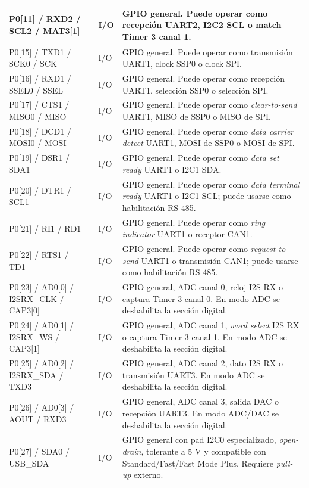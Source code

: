 ﻿\documentclass[11pt]{article}
\begin{document}
\begin{longtable}{|>{\raggedright\arraybackslash}p{}|>{\raggedright\arraybackslash}p{}|>{\raggedright\arraybackslash}p{}|>{\raggedright\arraybackslash}p{}|}
\hline
P0[11] / RXD2 / SCL2 / MAT3[1] & 49 & I/O & GPIO general. Puede operar como recepción UART2, I2C2 SCL o match Timer 3 canal 1. \\
\hline
P0[15] / TXD1 / SCK0 / SCK & 62 & I/O & GPIO general. Puede operar como transmisión UART1, clock SSP0 o clock SPI. \\
\hline
P0[16] / RXD1 / SSEL0 / SSEL & 63 & I/O & GPIO general. Puede operar como recepción UART1, selección SSP0 o selección SPI. \\
\hline
P0[17] / CTS1 / MISO0 / MISO & 61 & I/O & GPIO general. Puede operar como \textit{clear-to-send} UART1, MISO de SSP0 o MISO de SPI. \\
\hline
P0[18] / DCD1 / MOSI0 / MOSI & 60 & I/O & GPIO general. Puede operar como \textit{data carrier detect} UART1, MOSI de SSP0 o MOSI de SPI. \\
\hline
P0[19] / DSR1 / SDA1 & 59 & I/O & GPIO general. Puede operar como \textit{data set ready} UART1 o I2C1 SDA. \\
\hline
P0[20] / DTR1 / SCL1 & 58 & I/O & GPIO general. Puede operar como \textit{data terminal ready} UART1 o I2C1 SCL; puede usarse como habilitación RS-485. \\
\hline
P0[21] / RI1 / RD1 & 57 & I/O & GPIO general. Puede operar como \textit{ring indicator} UART1 o receptor CAN1. \\
\hline
P0[22] / RTS1 / TD1 & 56 & I/O & GPIO general. Puede operar como \textit{request to send} UART1 o transmisión CAN1; puede usarse como habilitación RS-485. \\
\hline
P0[23] / AD0[0] / I2SRX\_CLK / CAP3[0] & 9 & I/O & GPIO general, ADC canal 0, reloj I2S RX o captura Timer 3 canal 0. En modo ADC se deshabilita la sección digital. \\
\hline
P0[24] / AD0[1] / I2SRX\_WS / CAP3[1] & 8 & I/O & GPIO general, ADC canal 1, \textit{word select} I2S RX o captura Timer 3 canal 1. En modo ADC se deshabilita la sección digital. \\
\hline
P0[25] / AD0[2] / I2SRX\_SDA / TXD3 & 7 & I/O & GPIO general, ADC canal 2, dato I2S RX o transmisión UART3. En modo ADC se deshabilita la sección digital. \\
\hline
P0[26] / AD0[3] / AOUT / RXD3 & 6 & I/O & GPIO general, ADC canal 3, salida DAC o recepción UART3. En modo ADC/DAC se deshabilita la sección digital. \\
\hline
P0[27] / SDA0 / USB\_SDA & 25 & I/O & GPIO general con pad I2C0 especializado, \textit{open-drain}, tolerante a 5 V y compatible con Standard/Fast/Fast Mode Plus. Requiere \textit{pull-up} externo. \\

\end{longtable}
\end{document}
